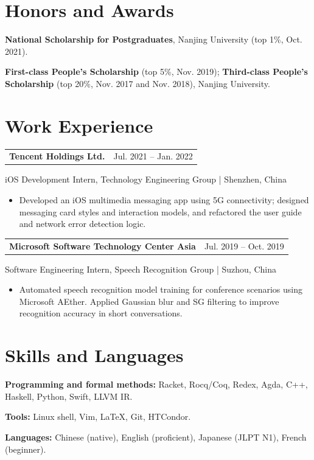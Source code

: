 \documentclass[letterpaper,11pt]{article}
\makeatletter
\newenvironment{cvitems}{
  \begin{itemize}[leftmargin=1.2em,itemsep=2pt,topsep=3pt,parsep=0pt,partopsep=0pt]
}{\end{itemize}}
\newcommand{\cvheading}[2]{%
  \Needspace{4\baselineskip}%
  \begin{tabularx}{\linewidth}{@{}>{\raggedright\arraybackslash}X@{\hspace{1em}}r@{}}%
    \textbf{#1} & #2
  \end{tabularx}\par
}
\newcommand{\cvdetail}[1]{#1\par}
\newcommand{\vsp}{\vspace{6pt}}
\makeatother
\begin{document}
\vsp

\section{Honors and Awards}
\textbf{National Scholarship for Postgraduates}, Nanjing University (top 1\%, Oct. 2021).\par
\textbf{First-class People's Scholarship} (top 5\%, Nov. 2019); \textbf{Third-class People's Scholarship} (top 20\%, Nov. 2017 and Nov. 2018), Nanjing University.\par

\newpage

\section{Work Experience}
\cvheading{Tencent Holdings Ltd.}{Jul. 2021 -- Jan. 2022}
\cvdetail{iOS Development Intern, Technology Engineering Group \enspace | \enspace Shenzhen, China}
\begin{cvitems}
  \item Developed an iOS multimedia messaging app using 5G connectivity; designed messaging card styles and interaction models, and refactored the user guide and network error detection logic.
\end{cvitems}

\vsp

\cvheading{Microsoft Software Technology Center Asia}{Jul. 2019 -- Oct. 2019}
\cvdetail{Software Engineering Intern, Speech Recognition Group \enspace | \enspace Suzhou, China}
\begin{cvitems}
  \item Automated speech recognition model training for conference scenarios using Microsoft AEther. Applied Gaussian blur and SG filtering to improve recognition accuracy in short conversations.
\end{cvitems}

\vsp



\section{Skills and Languages}
\textbf{Programming and formal methods:} Racket, Rocq/Coq, Redex, Agda, C++, Haskell, Python, Swift, LLVM IR.\par
\textbf{Tools:} Linux shell, Vim, \LaTeX, Git, HTCondor.\par
\textbf{Languages:} Chinese (native), English (proficient), Japanese (JLPT N1), French (beginner).
\end{document}

